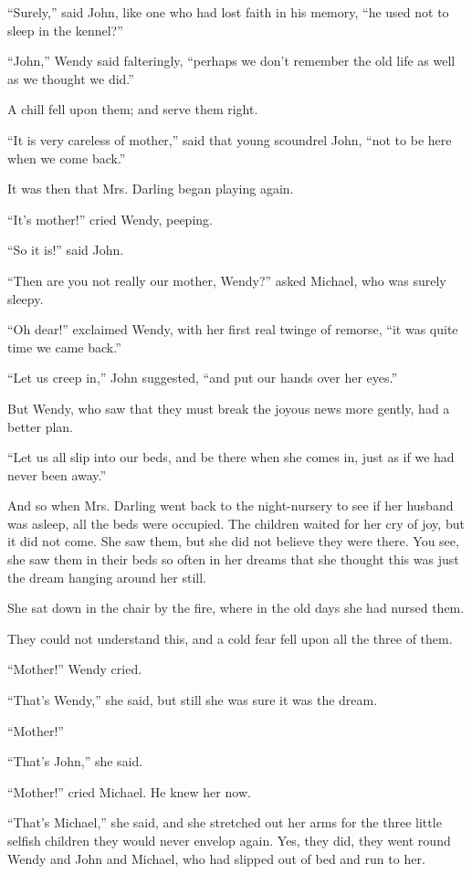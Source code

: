``Surely,'' said John, like one who had lost faith in his memory, ``he
used not to sleep in the kennel?''

``John,'' Wendy said falteringly, ``perhaps we don't remember the old life
as well as we thought we did.''

A chill fell upon them; and serve them right.

``It is very careless of mother,'' said that young scoundrel John, ``not
to be here when we come back.''

It was then that Mrs. Darling began playing again.

``It's mother!'' cried Wendy, peeping.

``So it is!'' said John.

``Then are you not really our mother, Wendy?'' asked Michael, who was
surely sleepy.

``Oh dear!'' exclaimed Wendy, with her first real twinge of remorse, ``it
was quite time we came back.''

``Let us creep in,'' John suggested, ``and put our hands over her eyes.''

But Wendy, who saw that they must break the joyous news more gently,
had a better plan.

``Let us all slip into our beds, and be there when she comes in, just as
if we had never been away.''

And so when Mrs. Darling went back to the night-nursery to see if her
husband was asleep, all the beds were occupied. The children waited for
her cry of joy, but it did not come. She saw them, but she did not
believe they were there. You see, she saw them in their beds so often
in her dreams that she thought this was just the dream hanging around
her still.

She sat down in the chair by the fire, where in the old days she had
nursed them.

They could not understand this, and a cold fear fell upon all the three
of them.

``Mother!'' Wendy cried.

``That's Wendy,'' she said, but still she was sure it was the dream.

``Mother!''

``That's John,'' she said.

``Mother!'' cried Michael. He knew her now.

``That's Michael,'' she said, and she stretched out her arms for the
three little selfish children they would never envelop again. Yes, they
did, they went round Wendy and John and Michael, who had slipped out of
bed and run to her.

